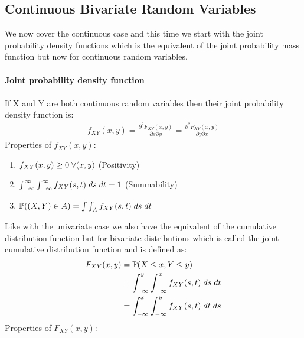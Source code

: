 \documentclass[,oneside]{article}
\begin{document}
\begin{enumerate}
\subsection{Continuous Bivariate Random Variables}
We now cover the continuous case and this time we start with the joint probability density functions which is the equivalent of the joint probability mass function but now for continuous random variables. \\ \\
\textbf{Joint probability density function}\\ \\
If X and Y are both continuous random variables then their joint probability density function is:
\begin{align*}
f_{XY}(x,y)=\frac{\partial^2 F_{XY}(x,y)}{\partial x \partial y}=\frac{\partial^2 F_{XY}(x,y)}{\partial y \partial x}
\end{align*}
Properties of $f_{XY}(x,y)$:\\
\begin{enumerate}
\item $f_{XY}(x,y) \geq 0\hspace{0.1cm} \forall (x, y)$ (Positivity) 
\item $\int_{-\infty}^{\infty} \int_{-\infty}^{\infty} f_{XY}(s,t)\hspace{0.1cm}ds\hspace{0.1cm}dt =1$ (Summability)
\item $\mathbb{P}((X,Y)\in A) = \int \int_{A} f_{XY}(s,t)\hspace{0.1cm}ds\hspace{0.1cm}dt$
\end{enumerate}
Like with the univariate case we also have the equivalent of the cumulative distribution function but for bivariate distributions which is called the joint cumulative distribution function and is defined as:
\begin{align*}
F_{XY}(x,y)&=\mathbb{P}(X \leq x, Y \leq y)\\
&=\int_{-\infty}^{y}\int_{-\infty}^{x} f_{XY}(s, t)\hspace{0.1cm}ds\hspace{0.1cm}dt\\
&=\int_{-\infty}^{x}\int_{-\infty}^{y} f_{XY}(s, t)\hspace{0.1cm}dt\hspace{0.1cm}ds
\end{align*}
Properties of $F_{XY}(x,y)$:\\
\begin{enumerate}

\end{enumerate}
\end{enumerate}
\end{document}
